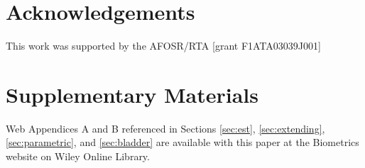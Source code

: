 \documentclass[useAMS,usenatbib,usegraphicx,referee]{biom}\usepackage[]{graphicx}\usepackage[]{color}
\begin{document}

\section*{Acknowledgements}

This work was supported by the AFOSR/RTA [grant F1ATA03039J001] \vspace*{-8pt}


\section*{Supplementary Materials}

Web Appendices A and B referenced in Sections \ref{sec:est}, \ref{sec:extending}, \ref{sec:parametric}, and \ref{sec:bladder} are available with this paper at the Biometrics website on Wiley Online Library.\vspace*{-8pt}



 

\label{lastpage}
\end{document}
